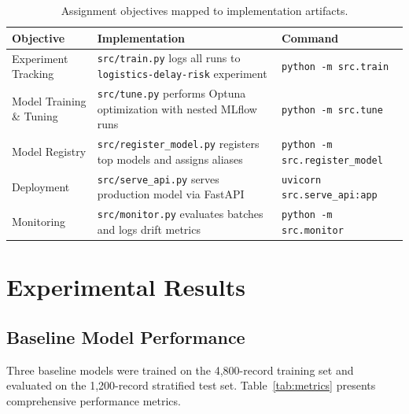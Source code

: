 \documentclass[11pt,a4paper]{article}
\begin{document}
\begin{table}[H]
\centering
\caption{Assignment objectives mapped to implementation artifacts.}
\label{tab:map}
\small
\begin{tabularx}{\linewidth}{lXX}
\toprule
\textbf{Objective} & \textbf{Implementation} & \textbf{Command} \\
\midrule
Experiment Tracking &
\texttt{src/train.py} logs all runs to \texttt{logistics-delay-risk} experiment &
\texttt{python -m src.train} \\
\addlinespace
Model Training \& Tuning &
\texttt{src/tune.py} performs Optuna optimization with nested MLflow runs &
\texttt{python -m src.tune} \\
\addlinespace
Model Registry &
\texttt{src/register\_model.py} registers top models and assigns aliases &
\texttt{python -m src.register\_model} \\
\addlinespace
Deployment &
\texttt{src/serve\_api.py} serves production model via FastAPI &
\texttt{uvicorn src.serve\_api:app} \\
\addlinespace
Monitoring &
\texttt{src/monitor.py} evaluates batches and logs drift metrics &
\texttt{python -m src.monitor} \\
\bottomrule
\end{tabularx}
\end{table}


\section{Experimental Results}
\label{sec:results}

\subsection{Baseline Model Performance}

Three baseline models were trained on the 4,800-record training set and evaluated on the 1,200-record stratified test set. Table~\ref{tab:metrics} presents comprehensive performance metrics.
\end{document}
